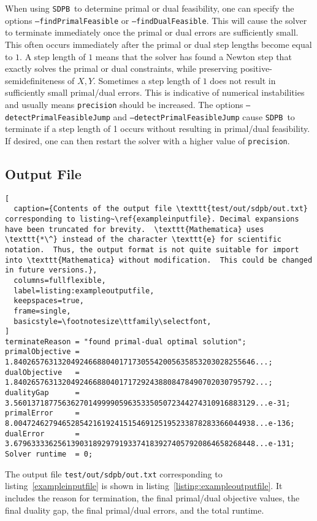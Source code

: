 \documentclass[12pt]{article}
\numberwithin{equation}{section}
\newcommand\SDPB{\texttt{SDPB}}
\begin{document}
When using \SDPB\ to determine primal or dual feasibility, one can specify the options \texttt{--findPrimalFeasible} or \texttt{--findDualFeasible}.  This will cause the solver to terminate immediately once the primal or dual errors are sufficiently small.  This often occurs immediately after the primal or dual step lengths become equal to $1$.  A step length of $1$ means that the solver has found a Newton step that exactly solves the primal or dual constraints, while preserving positive-semidefiniteness of $X,Y$.  Sometimes a step length of $1$ does not result in sufficiently small primal/dual errors.  This is indicative of numerical instabilities and usually means \texttt{precision} should be increased.  The options \texttt{--detectPrimalFeasibleJump} and \texttt{--detectPrimalFeasibleJump} cause \SDPB\ to terminate if a step length of 1 occurs without resulting in primal/dual feasibility.  If desired, one can then restart the solver with a higher value of \texttt{precision}.


\subsection{Output File}
\label{sec:output-file}

\begin{lstlisting}[
  caption={Contents of the output file \texttt{test/out/sdpb/out.txt} corresponding to listing~\ref{exampleinputfile}. Decimal expansions have been truncated for brevity.  \texttt{Mathematica} uses \texttt{*\^} instead of the character \texttt{e} for scientific notation.  Thus, the output format is not quite suitable for import into \texttt{Mathematica} without modification.  This could be changed in future versions.},
  columns=fullflexible,
  label=listing:exampleoutputfile,
  keepspaces=true,
  frame=single,
  basicstyle=\footnotesize\ttfamily\selectfont,
]
terminateReason = "found primal-dual optimal solution";
primalObjective = 1.8402657631320492466880401717305542005635853203028255646...;
dualObjective   = 1.8402657631320492466880401717292438808478490702030795792...;
dualityGap      = 3.5601371877563627014999905963533505072344274310916883129...e-31;
primalError     = 8.0047246279465285421619241515469125195233878283366044938...e-136;
dualError       = 3.6796333362561390318929791933741839274057920864658268448...e-131;
Solver runtime  = 0;
\end{lstlisting}


The output file \texttt{test/out/sdpb/out.txt} corresponding to
listing~\ref{exampleinputfile} is shown in
listing~\ref{listing:exampleoutputfile}. It includes the reason for
termination, the final primal/dual objective values, the final duality
gap, the final primal/dual errors, and the total runtime.
\end{document}
